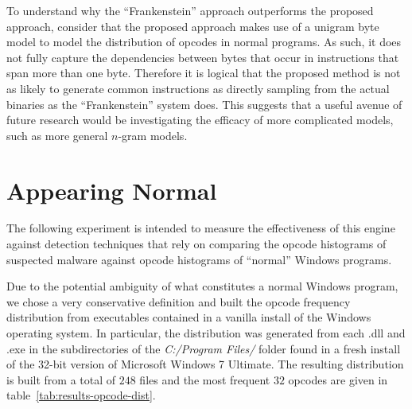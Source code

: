    To understand why the ``Frankenstein'' approach outperforms the proposed
    approach, consider that the proposed approach makes use of a unigram byte
    model to model the distribution of opcodes in normal programs. As such, it
    does not fully capture the dependencies between bytes that occur in
    instructions that span more than one byte. Therefore it is logical that the
    proposed method is not as likely to generate common instructions as directly
    sampling from the actual binaries as the ``Frankenstein'' system does. This
    suggests that a useful avenue of future research would be investigating the
    efficacy of more complicated models, such as more general $n$-gram models.

\section{Appearing Normal}

    The following experiment is intended to measure the effectiveness of
    this engine against detection techniques that rely on comparing the
    opcode histograms of suspected malware against opcode histograms of
    ``normal'' Windows programs.

    Due to the potential ambiguity of what constitutes a normal Windows
    program, we chose a very conservative definition and built the opcode
    frequency distribution from executables contained in a vanilla install
    of the Windows operating system. In particular, the distribution was
    generated from each {.dll} and {.exe} in the subdirectories of the
    \emph{C:/Program Files/} folder found in a fresh install of the 32-bit
    version of Microsoft Windows 7 Ultimate. The resulting distribution is
    built from a total of $248$ files and the most frequent $32$ opcodes are
    given in table~\ref{tab:results-opcode-dist}.

